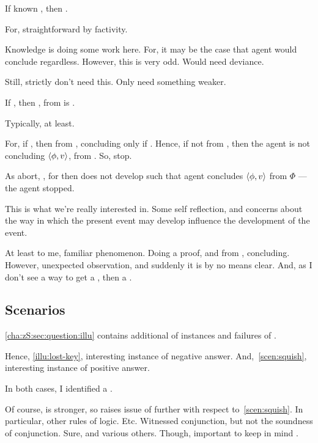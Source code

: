 \begin{note}
  \begin{proposition}
    If known \requ{}, then \curb{}.
    \begin{argument}
      For, straightforward by factivity.
    \end{argument}
  \end{proposition}

  Knowledge is doing some work here.
  For, it may be the case that agent would conclude regardless.
  However, this is very odd.
  Would need deviance.

  Still, strictly don't need this.
  Only need something weaker.

  \begin{proposition}[Feedback]
    If \requ{}, then \fc{}, from \agpe{} is \curb{}.
    \begin{argument}
      Typically, at least.

      For, if \requ{}, then from \agpe{}, concluding only if \fc{}.
      Hence, if not \fc{} from \agpe{}, then the agent is not concluding \(\langle \phi, v \rangle\), from .
      So, stop.

      As abort, \curb{}, for then does not develop such that agent concludes \(\langle \phi, v \rangle\) from \(\Phi\) --- the agent stopped.
    \end{argument}
  \end{proposition}

  This is what we're really interested in.
  Some self reflection, and concerns about the way in which the present event may develop influence the development of the event.

  At least to me, familiar phenomenon.
  Doing a proof, and from , concluding.
  However, unexpected observation, and suddenly it is by no means clear.
  And, as I don't see a way to get a \fc{}, then a \curb{}.
\end{note}

\subsection{Scenarios}
\label{cha:zS:sec:question:scenarios}

\begin{note}
  \autoref{cha:zS:sec:question:illu} contains additional  of instances and failures of \sCing{}.
\end{note}

\begin{note}
  Hence, \autoref{illu:lost-key}, interesting instance of negative answer.
  And,~\autoref{scen:squish}, interesting instance of positive answer.

  In both cases, I identified a \curb{}.

  Of course, \qzS{} is stronger, so raises issue of further  with respect to~\autoref{scen:squish}.
  In particular, other rules of logic.
  Etc.
  Witnessed conjunction, but not the soundness of conjunction.
  Sure, and various others.
  Though, important to keep in mind \curb{}.
\end{note}

